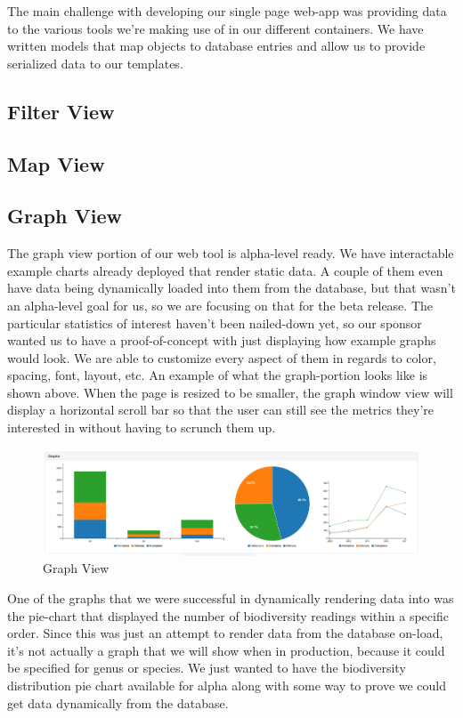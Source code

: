 \documentclass[journal]{IEEEtran}
\begin{document}
The main challenge with developing our single page web-app was providing data
to the various tools we’re making use of in our different containers. We have
written models that map objects to database entries and allow us to provide
serialized data to our templates.

\subsection{Filter View}

\subsection{Map View}

\subsection{Graph View}
The graph view portion of our web tool is alpha-level ready. We have
interactable example charts already deployed that render  static data. A couple
of them even have data being dynamically loaded into them from the database,
but that wasn’t an alpha-level goal for us, so we are focusing on that for the
beta release. The particular statistics of interest haven’t been nailed-down
yet, so our sponsor wanted us to have a proof-of-concept with just displaying
how example graphs would look. We are able to customize every aspect of them in
regards to color, spacing, font, layout, etc. An example of what the
graph-portion looks like is shown above. When the page is resized to be
smaller, the graph window view will display a horizontal scroll bar so that the
user can still see the metrics they’re interested in without having to scrunch
them up.

\begin{figure}[h]
\caption{Graph View}
\centering
\includegraphics[width=1.0\textwidth]{images/figure_6.jpg}
\end{figure}

One of the graphs that we were successful in dynamically rendering data into
was the pie-chart that displayed the number of biodiversity readings within a
specific order. Since this was just an attempt to render data from the database
on-load, it’s not actually a graph that we will show when in production,
because it could be specified for genus or species. We just wanted to have the
biodiversity distribution pie chart available for alpha along with some way to
prove we could get data dynamically from the database.
\end{document}
